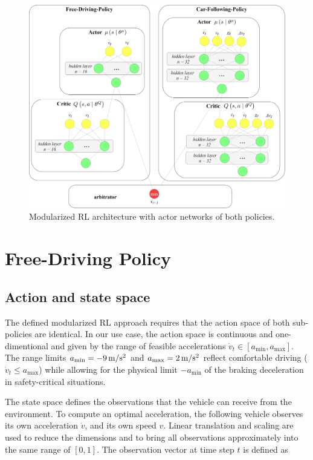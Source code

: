 \documentclass[review]{elsarticle}
\providecommand{\sub}[1]{_{\mathrm{#1}}}  %
\providecommand{\3}{{\ss}}
\begin{document}
	\begin{figure}
		\centering
		\includegraphics[width=12cm]{images/MRL_small}
		\caption{Modularized RL architecture with actor networks of both policies.} 
		\label{fig:MRL}
	\end{figure}
	
	
	
	
	
	
	\section{Free-Driving Policy}
	\label{sec:FreeDrivingPolicy}
	\subsection{Action and state space}
	\label{stateSpaceFree}
	The defined modularized RL approach requires that the action space of
	both sub-policies are identical. In our use case, the action space is
	continuous and one-dimentional and given by the range of feasible accelerations
	$\dot{v}_t \in [a\sub{min}, a\sub{max}]$. The range limits
	$a\sub{min}= \unit[-9]{m/s^2}$ and  $a\sub{max} =\unit[2]{m/s^2}$
	reflect comfortable driving ($\dot{v}_t \le a\sub{max}$) while
	allowing for the physical limit $-a\sub{min}$ of the braking
	deceleration in safety-critical
	situations.
	
	The state space defines the observations that the vehicle can receive from the environment. To compute an optimal
	acceleration, the following vehicle observes its own acceleration $\dot{v}$,
	and its own speed $v$. Linear translation and scaling are used to
	reduce the dimensions and to bring all observations approximately into
	the same range of $[0,1]$. The observation vector at time step $t$ is defined
	as 
	
\end{document}
